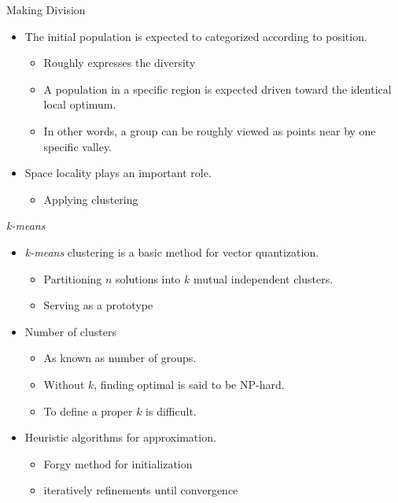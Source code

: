 \begin{frame}{Making Division}
  \begin{itemize}
    \item The initial population is expected to categorized according to position.
      \begin{itemize}
        \item Roughly expresses the diversity
        \item A population in a specific region is expected driven
          toward the identical local optimum.
        \item In other words, a group can be roughly viewed as points
          near by one specific valley. 
      \end{itemize}
      \vspace*{14pt}
    \item Space locality plays an important role.
      \begin{itemize}
        \item Applying clustering
      \end{itemize}
  \end{itemize}
\end{frame}

\begin{frame}{\emph{k-means}}
  \begin{itemize}
    \item \emph{k-means} clustering is a basic method for vector quantization.
      \begin{itemize}
        \item Partitioning $n$ solutions into $k$ mutual independent
          clusters.
        \item Serving as a prototype
      \end{itemize}
      \vspace*{14pt}
    \item Number of clusters
      \begin{itemize}
        \item As known as number of groups.
        \item Without $k$, finding optimal is said to be NP-hard.  
        \item To define a proper $k$ is difficult.
      \end{itemize}
      \vspace*{14pt}
    \item  Heuristic algorithms for approximation.
      \begin{itemize}
        \item Forgy method for initialization
        \item iteratively refinements until convergence
      \end{itemize}

  \end{itemize}
\end{frame}

